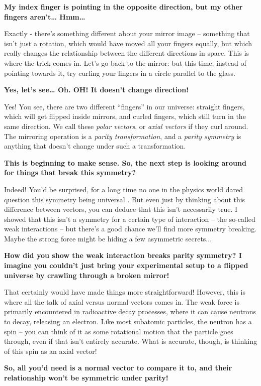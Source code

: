 \documentclass{article}
\newcommand{\q}[1]{\vspace{10pt}
\textbf{#1}}
\begin{document}
\begin{multicols}{2}
\q{My index finger is pointing in the opposite direction, but my other fingers aren’t… Hmm…}

Exactly - there’s something different about your mirror image – something that isn’t just a rotation, which would have moved all your fingers equally, but which really changes the relationship between the different directions in space. This is where the trick comes in. Let’s go back to the mirror: but this time, instead of pointing towards it, try curling your fingers in a circle parallel to the glass.

\q{Yes, let’s see… Oh. OH! It doesn’t change direction!}

Yes! You see, there are two different “fingers” in our universe: straight fingers, which will get flipped inside mirrors, and curled fingers, which still turn in the same direction. We call these \textit{polar vectors}, or \textit{axial vectors} if they curl around. The mirroring operation is a \textit{parity transformation}, and a \textit{parity symmetry} is anything that doesn’t change under such a transformation.

\q{This is beginning to make sense. So, the next step is looking around for things that break this symmetry?}

Indeed! You’d be surprised, for a long time no one in the physics world dared question this symmetry being universal \cite{N7}. But even just by thinking about this difference between vectors, you can deduce that this isn’t necessarily true. I showed that this isn’t a symmetry for a certain type of interaction – the so-called weak interactions – but there’s a good chance we’ll find more symmetry breaking. Maybe the strong force might be hiding a few asymmetric secrets...

\q{How did you show the weak interaction breaks parity symmetry? I imagine you couldn’t just bring your experimental setup to a flipped universe by crawling through a broken mirror!}

That certainly would have made things more straightforward! However, this is where all the talk of axial versus normal vectors comes in. The weak force is primarily encountered in radioactive decay processes, where it can cause neutrons to decay, releasing an electron. Like most subatomic particles, the neutron has a spin – you can think of it as some rotational motion that the particle goes through, even if that isn’t entirely accurate. What is accurate, though, is thinking of this spin as an axial vector!

\q{So, all you’d need is a normal vector to compare it to, and their relationship won't be symmetric under parity!}


\end{multicols}
\end{document}
